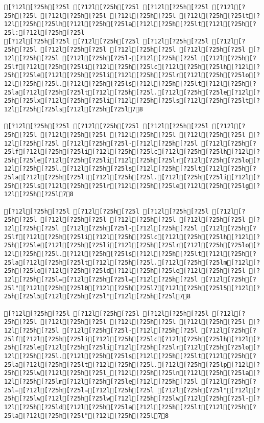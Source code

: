 \documentclass{scrartcl}
\begin{document}
\begin{Verbatim}
[?12l[?25h[?25l [?12l[?25h[?25l [?12l[?25h[?25l [?12l[?25h[?25l [?12l[?25h[?25l [?12l[?25h[?25l [?12l[?25h[?25lt[?12l[?25h[?25lh[?12l[?25h[?25la[?12l[?25h[?25lt[?12l[?25h[?25l:[?12l[?25h[?25l
[?12l[?25h[?25l [?12l[?25h[?25l [?12l[?25h[?25l [?12l[?25h[?25l [?12l[?25h[?25l [?12l[?25h[?25l [?12l[?25h[?25l [?12l[?25h[?25l [?12l[?25h[?25l-[?12l[?25h[?25l [?12l[?25h[?25lf[?12l[?25h[?25li[?12l[?25h[?25lc[?12l[?25h[?25lh[?12l[?25h[?25le[?12l[?25h[?25li[?12l[?25h[?25lr[?12l[?25h[?25lo[?12l[?25h[?25l.[?12l[?25h[?25ls[?12l[?25h[?25lt[?12l[?25h[?25la[?12l[?25h[?25lt[?12l[?25h[?25l.[?12l[?25h[?25le[?12l[?25h[?25lx[?12l[?25h[?25li[?12l[?25h[?25ls[?12l[?25h[?25lt[?12l[?25h[?25ls[?12l[?25h[?25l78

[?12l[?25h[?25l [?12l[?25h[?25l [?12l[?25h[?25l [?12l[?25h[?25l [?12l[?25h[?25l [?12l[?25h[?25l [?12l[?25h[?25l [?12l[?25h[?25l [?12l[?25h[?25l-[?12l[?25h[?25l [?12l[?25h[?25lf[?12l[?25h[?25li[?12l[?25h[?25lc[?12l[?25h[?25lh[?12l[?25h[?25le[?12l[?25h[?25li[?12l[?25h[?25lr[?12l[?25h[?25lo[?12l[?25h[?25l.[?12l[?25h[?25ls[?12l[?25h[?25lt[?12l[?25h[?25la[?12l[?25h[?25lt[?12l[?25h[?25l.[?12l[?25h[?25li[?12l[?25h[?25ls[?12l[?25h[?25lr[?12l[?25h[?25le[?12l[?25h[?25lg[?12l[?25h[?25l78

[?12l[?25h[?25l [?12l[?25h[?25l [?12l[?25h[?25l [?12l[?25h[?25l [?12l[?25h[?25l [?12l[?25h[?25l [?12l[?25h[?25l [?12l[?25h[?25l [?12l[?25h[?25l-[?12l[?25h[?25l [?12l[?25h[?25lf[?12l[?25h[?25li[?12l[?25h[?25lc[?12l[?25h[?25lh[?12l[?25h[?25le[?12l[?25h[?25li[?12l[?25h[?25lr[?12l[?25h[?25lo[?12l[?25h[?25l.[?12l[?25h[?25ls[?12l[?25h[?25lt[?12l[?25h[?25la[?12l[?25h[?25lt[?12l[?25h[?25l.[?12l[?25h[?25lm[?12l[?25h[?25lo[?12l[?25h[?25ld[?12l[?25h[?25le[?12l[?25h[?25l [?12l[?25h[?25l=[?12l[?25h[?25l=[?12l[?25h[?25l [?12l[?25h[?25l"[?12l[?25h[?25l0[?12l[?25h[?25l7[?12l[?25h[?25l5[?12l[?25h[?25l5[?12l[?25h[?25l"[?12l[?25h[?25l78

[?12l[?25h[?25l [?12l[?25h[?25l [?12l[?25h[?25l [?12l[?25h[?25l [?12l[?25h[?25l [?12l[?25h[?25l [?12l[?25h[?25l [?12l[?25h[?25l [?12l[?25h[?25l-[?12l[?25h[?25l [?12l[?25h[?25lf[?12l[?25h[?25li[?12l[?25h[?25lc[?12l[?25h[?25lh[?12l[?25h[?25le[?12l[?25h[?25li[?12l[?25h[?25lr[?12l[?25h[?25lo[?12l[?25h[?25l.[?12l[?25h[?25ls[?12l[?25h[?25lt[?12l[?25h[?25la[?12l[?25h[?25lt[?12l[?25h[?25l.[?12l[?25h[?25lp[?12l[?25h[?25lw[?12l[?25h[?25l_[?12l[?25h[?25ln[?12l[?25h[?25la[?12l[?25h[?25lm[?12l[?25h[?25le[?12l[?25h[?25l [?12l[?25h[?25l=[?12l[?25h[?25l=[?12l[?25h[?25l [?12l[?25h[?25l"[?12l[?25h[?25lw[?12l[?25h[?25lw[?12l[?25h[?25lw[?12l[?25h[?25l-[?12l[?25h[?25ld[?12l[?25h[?25la[?12l[?25h[?25lt[?12l[?25h[?25la[?12l[?25h[?25l"[?12l[?25h[?25l78


\end{Verbatim}
\end{document}
